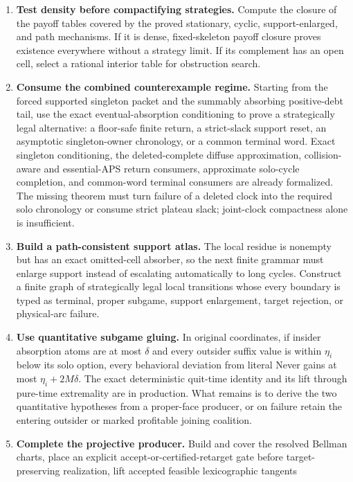 \documentclass[11pt]{article}
\begin{document}
\begin{enumerate}
\item \textbf{Test density before compactifying strategies.}  Compute the
closure of the payoff tables covered by the proved stationary, cyclic,
support-enlarged, and path mechanisms.  If it is dense, fixed-skeleton payoff
closure proves existence everywhere without a strategy limit.  If its
complement has an open cell, select a rational interior table for obstruction
search.
\item \textbf{Consume the combined counterexample regime.}  Starting from the
forced supported singleton packet and the summably absorbing positive-debt
tail, use the exact eventual-absorption conditioning to prove a strategically
legal alternative: a floor-safe finite return, a strict-slack support reset,
an asymptotic singleton-owner chronology, or a common terminal word.  Exact
singleton conditioning, the deleted-complete diffuse approximation,
collision-aware and essential-APS return consumers, approximate solo-cycle
completion, and common-word terminal consumers are already formalized.  The
missing theorem must turn failure of a deleted clock into the required solo
chronology or consume strict plateau slack; joint-clock compactness alone is
insufficient.
\item \textbf{Build a path-consistent support atlas.}  The local residue is
nonempty but has an exact omitted-cell absorber, so the next finite grammar
must enlarge support instead of escalating automatically to long cycles.
Construct a finite graph of strategically legal local transitions whose every
boundary is typed as terminal, proper subgame, support enlargement, target
rejection, or physical-arc failure.
\item \textbf{Use quantitative subgame gluing.}  In original coordinates, if
insider absorption atoms are at most \(\delta\) and every outsider suffix
value is within \(\eta_i\) below its solo option, every behavioral deviation
from literal Never gains at most \(\eta_i+2M\delta\).  The exact deterministic
quit-time identity and its lift through pure-time extremality are in
production.  What remains is to derive the two quantitative hypotheses from a
proper-face producer, or on failure retain the entering outsider or marked
profitable joining coalition.
\item \textbf{Complete the projective producer.}  Build and cover the resolved
Bellman charts, place an explicit accept-or-certified-retarget gate before
target-preserving realization, lift accepted feasible lexicographic tangents

\end{enumerate}
\end{document}
